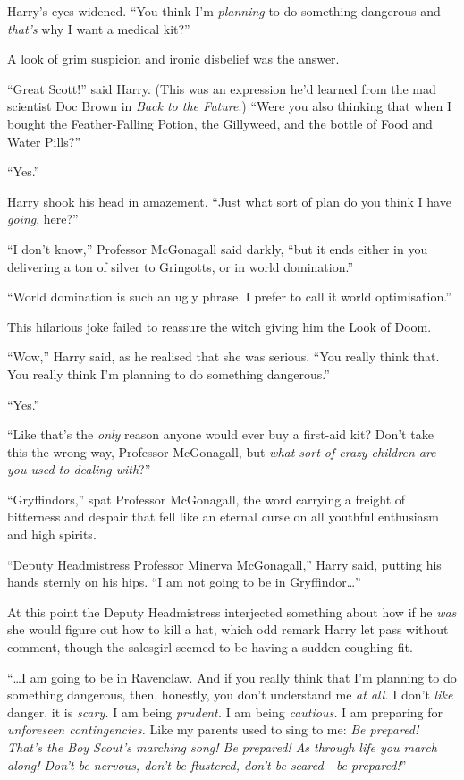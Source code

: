 Harry’s eyes widened. “You think I’m \emph{planning} to do something dangerous and \emph{that’s} why I want a medical kit?”

A look of grim suspicion and ironic disbelief was the answer.

“Great Scott!” said Harry. (This was an expression he’d learned from the mad scientist Doc Brown in \emph{Back to the Future}.) “Were you also thinking that when I bought the Feather-Falling Potion, the Gillyweed, and the bottle of Food and Water Pills?”

“Yes.”

Harry shook his head in amazement. “Just what sort of plan do you think I have \emph{going}, here?”

“I don’t know,” Professor McGonagall said darkly, “but it ends either in you delivering a ton of silver to Gringotts, or in world domination.”

“World domination is such an ugly phrase. I prefer to call it world optimisation.”

This hilarious joke failed to reassure the witch giving him the Look of Doom.

“Wow,” Harry said, as he realised that she was serious. “You really think that. You really think I’m planning to do something dangerous.”

“Yes.”

“Like that’s the \emph{only} reason anyone would ever buy a first-aid kit? Don’t take this the wrong way, Professor McGonagall, but \emph{what sort of crazy children are you used to dealing with}?”

“Gryffindors,” spat Professor McGonagall, the word carrying a freight of bitterness and despair that fell like an eternal curse on all youthful enthusiasm and high spirits.

“Deputy Headmistress Professor Minerva McGonagall,” Harry said, putting his hands sternly on his hips. “I am not going to be in Gryffindor…”

At this point the Deputy Headmistress interjected something about how if he \emph{was} she would figure out how to kill a hat, which odd remark Harry let pass without comment, though the salesgirl seemed to be having a sudden coughing fit.

“…I am going to be in Ravenclaw. And if you really think that I’m planning to do something dangerous, then, honestly, you don’t understand me \emph{at all.} I don’t \emph{like} danger, it is \emph{scary.} I am being \emph{prudent.} I am being \emph{cautious.} I am preparing for \emph{unforeseen contingencies.} Like my parents used to sing to me: \emph{Be prepared! That’s the Boy Scout’s marching song! Be prepared! As through life you march along! Don’t be nervous, don’t be flustered, don’t be scared—be prepared!}”

